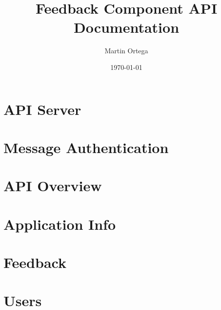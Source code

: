 \documentclass{report}
\begin{document}
	\title{Feedback Component API Documentation}
	\author{Martin Ortega}
	\date{\today}
	\maketitle

	\tableofcontents

	\chapter{API Server}
		

	\chapter{Message Authentication}
		

	\chapter{API Overview}
		

	\chapter{Application Info}
		

%		

	\chapter{Feedback}
		

	\chapter{Users}
		
\end{document}
